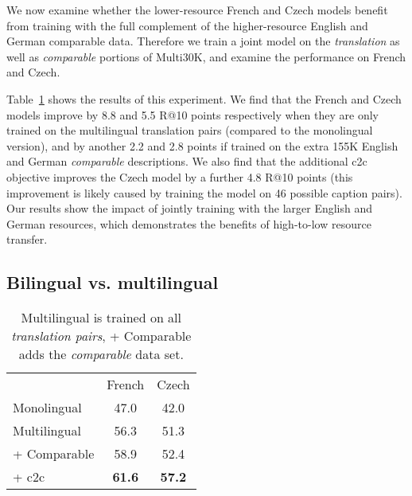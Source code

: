We now examine whether the lower-resource French and Czech models benefit from training with the full complement of the higher-resource English and German comparable data. Therefore we train a joint model on the \textit{translation} as well as \textit{comparable} portions of Multi30K, and examine the performance on French and Czech.

Table~\ref{tab:multilingual-highlow} shows the results of this experiment. We find that the French and Czech models improve by 8.8 and 5.5 R@10 points respectively when they are only trained on the multilingual translation pairs (compared to the monolingual version), and by another 2.2 and 2.8 points if trained on the extra 155K English and German \textit{comparable} descriptions. We also find that the additional c2c objective improves the Czech model by a further 4.8 R@10 points (this improvement is likely caused by training the model on 46 possible caption pairs). Our results show the impact of jointly training with the larger English and German resources, which demonstrates the benefits of high-to-low resource transfer.





\subsection{Bilingual vs. multilingual}
\label{sec:bivsmult}

\begin{table}
\centering
\renewcommand{\arraystretch}{1.3}
\begin{tabular}{lcc}
\toprule
& French & Czech \\
\cmidrule{2-3}
Monolingual    & 47.0 & 42.0\\
Multilingual   & 56.3 & 51.3 \\
+ Comparable   & 58.9 & 52.4 \\
+ c2c          & \bf{61.6} & \bf{57.2} \\
\bottomrule
\end{tabular}
\caption{Multilingual is trained on all \emph{translation pairs}, 
+ Comparable adds the \emph{comparable} data set.}
\label{tab:multilingual-highlow}
\end{table}

